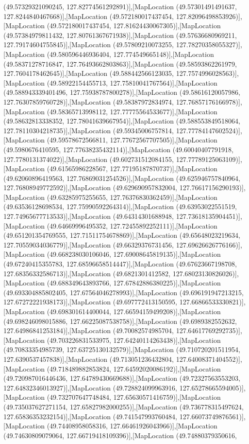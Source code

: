 (49.57329321090245, 127.82774561292891)],[MapLocation (49.57301491491637, 127.8244840467668)],[MapLocation (49.572180017437454, 127.82096498853926)],[MapLocation (49.572180017437454, 127.81624430067305)],[MapLocation (49.57384979811432, 127.80761367671938)],[MapLocation (49.57636680969211, 127.79174604755845)],[MapLocation (49.57809210073255, 127.78270358055327)],[MapLocation (49.580596446936404, 127.774549665148)],[MapLocation (49.58371278716847, 127.76493662803863)],[MapLocation (49.58593862261979, 127.7604178462645)],[MapLocation (49.588442566123035, 127.7574996028563)],[MapLocation (49.58922154455713, 127.75810041767564)],[MapLocation (49.588943339401496, 127.75938787800278)],[MapLocation (49.58616120057986, 127.76307859760728)],[MapLocation (49.58387972834974, 127.76857176166978)],[MapLocation (49.58365713998112, 127.77775564533677)],[MapLocation (49.58632813338352, 127.78041639667954)],[MapLocation (49.588553849518064, 127.78110304218735)],[MapLocation (49.59345006757814, 127.77784147602524)],[MapLocation (49.59578672566811, 127.77672567707505)],[MapLocation (49.5980676410595, 127.77638235432114)],[MapLocation (49.60040407791918, 127.7780131374022)],[MapLocation (49.602731512084155, 127.77789125063109)],[MapLocation (49.61565986228567, 127.77195187870737)],[MapLocation (49.62060896419563, 127.76869031254526)],[MapLocation (49.625946757840964, 127.76808949772592)],[MapLocation (49.629690957832004, 127.76617156290193)],[MapLocation (49.63285975255655, 127.76376830362459)],[MapLocation (49.63536128698534, 127.75990592264314)],[MapLocation (49.63953022551519, 127.74965677713533)],[MapLocation (49.64314301688948, 127.73618135904451)],[MapLocation (49.64669996495352, 127.72455892252111)],[MapLocation (49.651201354769555, 127.71511754678869)],[MapLocation (49.65648023219634, 127.70559034036779)],[MapLocation (49.66329376731456, 127.69626626776166)],[MapLocation (49.668238030106046, 127.69008645819135)],[MapLocation (49.67240415355783, 127.68596658514447)],[MapLocation (49.67623667198708, 127.68356332586713)],[MapLocation (49.6821301412582, 127.68023130826026)],[MapLocation (49.688349643893766, 127.67842886380225)],[MapLocation (49.693304885802405, 127.67564046278993)],[MapLocation (49.696191947213215, 127.67272221938173)],[MapLocation (49.697772413150595, 127.66866533330821)],[MapLocation (49.698301614400044, 127.66594159499208)],[MapLocation (49.698246098015886, 127.66225087538758)],[MapLocation (49.6989382552632, 127.64986841253184)],[MapLocation (49.70082574985704, 127.64617769292735)],[MapLocation (49.703226831533975, 127.64240114263438)],[MapLocation (49.70833354985739, 127.63725130132579)],[MapLocation (49.710720201511954, 127.6390537457838)],[MapLocation (49.713051236432804, 127.64008371404552)],[MapLocation (49.718489882853824, 127.64592020086192)],[MapLocation (49.720987016446436, 127.64789430669688)],[MapLocation (49.72327563553203, 127.64832346013927)],[MapLocation (49.728824099963916, 127.65278665594005)],[MapLocation (49.732707647748484, 127.65630571416759)],[MapLocation (49.735037627271154, 127.65827982000255)],[MapLocation (49.736778315497624, 127.65836353232154)],[MapLocation (49.741547993760484, 127.66073749876561)],[MapLocation (49.74408958058316, 127.66461926043966)],[MapLocation (49.74630809079064, 127.66719418109396)],[MapLocation (49.74880379350616, 